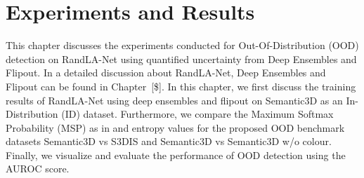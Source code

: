 

    \chapter{Experiments and Results}
    This chapter discusses the experiments conducted for Out-Of-Distribution (OOD) detection on RandLA-Net using quantified uncertainty from Deep Ensembles and Flipout.
    In a detailed discussion about RandLA-Net, Deep Ensembles and Flipout can be found in Chapter~[\$]. In this chapter, we first discuss the training results of RandLA-Net using deep ensembles and flipout on Semantic3D as an In-Distribution (ID) dataset.
    Furthermore, we compare the Maximum Softmax Probability (MSP) as in \cite{hendrycks2016baseline_MSP} and entropy values for the proposed OOD benchmark datasets Semantic3D vs S3DIS and Semantic3D vs Semantic3D w/o colour.
    Finally, we visualize and evaluate the performance of OOD detection using the AUROC score.

